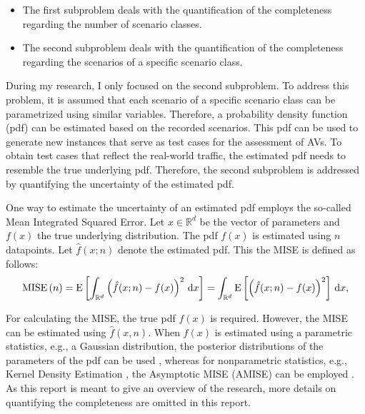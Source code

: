 \begin{itemize}
	\item The first subproblem deals with the quantification of the completeness regarding the number of scenario classes. 
	\item The second subproblem deals with the quantification of the completeness regarding the scenarios of a specific scenario class.
\end{itemize}

During my research, I only focused on the second subproblem. To address this problem, it is assumed that each scenario of a specific scenario class can be parametrized using similar variables. Therefore, a probability density function (pdf) can be estimated based on the recorded scenarios. This pdf can be used to generate new instances that serve as test cases for the assessment of AVs. To obtain test cases that reflect the real-world traffic, the estimated pdf needs to resemble the true underlying pdf. Therefore, the second subproblem is addressed by quantifying the uncertainty of the estimated pdf.

One way to estimate the uncertainty of an estimated pdf employs the so-called Mean Integrated Squared Error. Let $x \in \mathbb{R}^d$ be the vector of parameters and $f(x)$ the true underlying distribution. The pdf $f(x)$ is estimated using $n$ datapoints. Let $\hat{f}(x;n)$ denote the estimated pdf. This the MISE is defined as follows:
\begin{equation} \label{eq:mise}
	\textup{MISE} \left( n \right) = \textup{E} \left[  \int_{\mathbb{R}^d} \left(\hat{f}(x;n) - f(x)\right)^2 \, \textup{d}x \right] = \int_{\mathbb{R}^d} \textup{E} \left[ \left(\hat{f}(x;n) - f(x)\right)^2 \right] \, \textup{d}x,
\end{equation}

For calculating the MISE, the true pdf $f(x)$ is required. However, the MISE can be estimated using $\hat{f}(x, n)$. When $f(x)$ is estimated using a parametric statistics, e.g., a Gaussian distribution, the posterior distributions of the parameters of the pdf can be used \cite{bishop2006pattern}, whereas for nonparametric statistics, e.g., Kernel Density Estimation \cite{rosenblatt1956remarks, parzen1962estimation}, the Asymptotic MISE (AMISE) can be employed \cite{chen2017tutorial}. As this report is meant to give an overview of the research, more details on quantifying the completeness are omitted in this report.
